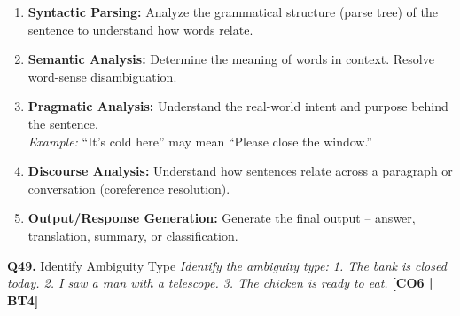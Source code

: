 \documentclass[12pt,a4paper]{article}
\newcommand{\Qno}[1]{\textbf{\color{darkred}Q#1.}}
\newcommand{\term}[1]{\textbf{\color{headingcolor}#1}}
\begin{document}
\begin{answerenv}
\begin{enumerate}[leftmargin=1.8em, itemsep=4pt]
  \item \term{Syntactic Parsing:} Analyze the grammatical structure (parse tree) of the sentence to understand how words relate.
  
  \item \term{Semantic Analysis:} Determine the meaning of words in context. Resolve word-sense disambiguation.
  
  \item \term{Pragmatic Analysis:} Understand the real-world intent and purpose behind the sentence.\\
  \textit{Example:} ``It's cold here'' may mean ``Please close the window.''
  
  \item \term{Discourse Analysis:} Understand how sentences relate across a paragraph or conversation (coreference resolution).
  
  \item \term{Output/Response Generation:} Generate the final output -- answer, translation, summary, or classification.
\end{enumerate}

\end{answerenv}

\vspace{8pt}

\begin{questionbox}{\Qno{49} Identify Ambiguity Type}
\textit{Identify the ambiguity type: 1. The bank is closed today. 2. I saw a man with a telescope. 3. The chicken is ready to eat.} \hfill \textbf{[CO6 | BT4]}
\end{questionbox}
\end{document}
